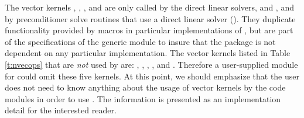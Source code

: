 The vector kernels , , , and
 are only called by the {\ida} direct linear solvers, 
{\idadense} and {\idaband}, and by preconditioner solve routines that use a 
direct linear solver ({\idabbdpre}). They duplicate 
functionality provided by macros in particular implementations of {\nvector},
but are part of the specifications of the generic {\nvector} module to insure 
that the {\ida} package is not dependent on any particular {\nvector} implementation.
The vector kernels listed in Table \ref{t:nvecops} that are {\em not} used by
{\ida} are: , , , , 
and . Therefore a user-supplied {\nvector} module for {\ida} could 
omit these five kernels.
At this point, we should emphasize that the {\ida} user does not need to know 
anything about the usage of vector kernels by the {\ida} code modules in order 
to use {\ida}. The information is presented as an implementation detail for the 
interested reader.


